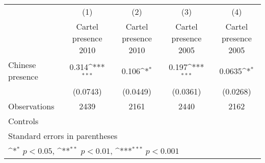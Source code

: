 {
\def\sym#1{\ifmmode^{#1}\else\(^{#1}\)\fi}
\begin{tabular}{l*{4}{c}}
\hline\hline
                    &\multicolumn{1}{c}{(1)}&\multicolumn{1}{c}{(2)}&\multicolumn{1}{c}{(3)}&\multicolumn{1}{c}{(4)}\\
                    &\multicolumn{1}{c}{Cartel presence 2010}&\multicolumn{1}{c}{Cartel presence 2010}&\multicolumn{1}{c}{Cartel presence 2005}&\multicolumn{1}{c}{Cartel presence 2005}\\
\hline
Chinese presence    &       0.314\sym{***}&       0.106\sym{*}  &       0.197\sym{***}&      0.0635\sym{*}  \\
                    &    (0.0743)         &    (0.0449)         &    (0.0361)         &    (0.0268)         \\
\hline
Observations        &        2439         &        2161         &        2440         &        2162         \\
Controls            &                     &                     &                     &                     \\
\hline\hline
\multicolumn{5}{l}{\footnotesize Standard errors in parentheses}\\
\multicolumn{5}{l}{\footnotesize \sym{*} \(p<0.05\), \sym{**} \(p<0.01\), \sym{***} \(p<0.001\)}\\
\end{tabular}
}
